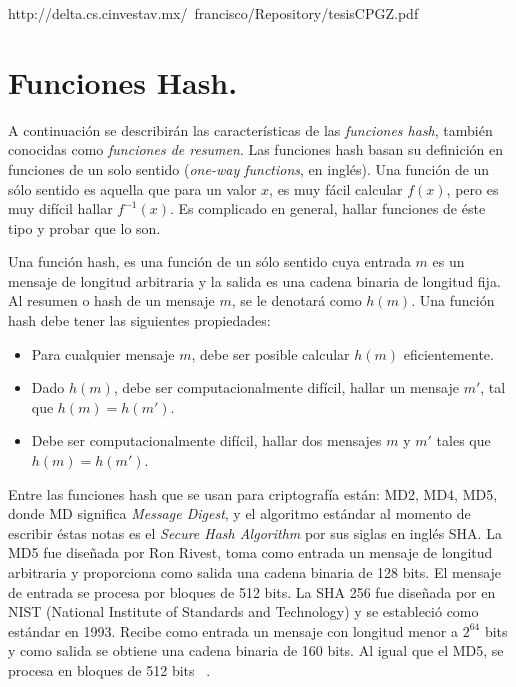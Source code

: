 http://delta.cs.cinvestav.mx/~francisco/Repository/tesisCPGZ.pdf

\section{Funciones Hash. }
A continuaci\'on se describir\'an las caracter\'isticas de las {\it funciones hash}, tambi\'en conocidas como {\it funciones de resumen}. Las funciones hash basan su definici\'on en funciones de un solo sentido  ({\it one-way functions}, en ingl\'es). Una funci\'on de un s\'olo sentido es aquella que para un valor $x$, es  muy f\'acil calcular $f(x)$, pero es muy dif\'icil hallar $f^{-1}(x)$. Es complicado en general, hallar funciones de \'este tipo y probar que lo son.
\begin{definition}
Una funci\'on hash, es una funci\'on de un s\'olo sentido cuya entrada $m$  es un mensaje de longitud arbitraria y la salida es una cadena binaria de longitud fija. Al resumen o hash de un mensaje $m$, se le denotar\'a como $h(m)$. Una funci\'on hash debe
tener las siguientes propiedades:
\begin{itemize}
	\item Para cualquier mensaje $m$, debe ser posible calcular $h(m)$ eficientemente. 
	\item Dado $h(m)$, debe ser computacionalmente dif\'icil, hallar un mensaje $m'$, tal que $h(m)=h(m')$.
	\item Debe ser computacionalmente dif\'icil, hallar dos mensajes $m$ y $m'$ tales que $h(m)=h(m')$.
\end{itemize}
\end{definition}
 
Entre las funciones hash que se usan para criptograf\'ia est\'an: MD2, MD4, MD5, donde MD significa {\it Message Digest}, y el algoritmo est\'andar al momento de escribir \'estas notas es el {\it Secure Hash Algorithm} por sus siglas en ingl\'es SHA.
  La MD5 fue dise\~nada por Ron Rivest, toma como entrada un mensaje de longitud arbitraria y proporciona como salida una cadena binaria de 128 bits.
El mensaje de entrada se procesa por bloques de 512 bits.  La SHA 256 fue dise\~nada por en NIST (National Institute of Standards and Technology) y se estableci\'o como est\'andar en 1993. Recibe como entrada un mensaje con longitud menor a $2^{64}$ bits y
como salida se obtiene una cadena binaria de 160 bits. Al igual que el MD5, se procesa en bloques de 512 bits ~\cite{modes}.


